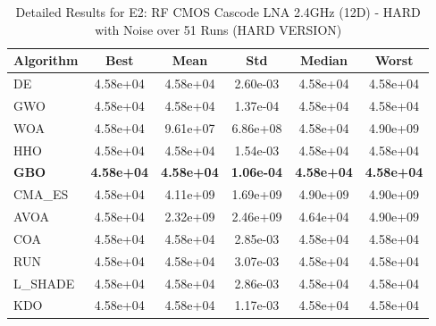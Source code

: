 \begin{table}[htbp]
\centering
\caption{Detailed Results for E2: RF CMOS Cascode LNA 2.4GHz (12D) - HARD with Noise over 51 Runs (HARD VERSION)}
\label{tab:P2_detailed}
\small
\begin{tabular}{lccccc}
\toprule
\textbf{Algorithm} & \textbf{Best} & \textbf{Mean} & \textbf{Std} & \textbf{Median} & \textbf{Worst} \\
\midrule
DE & 4.58e+04 & 4.58e+04 & 2.60e-03 & 4.58e+04 & 4.58e+04 \\
GWO & 4.58e+04 & 4.58e+04 & 1.37e-04 & 4.58e+04 & 4.58e+04 \\
WOA & 4.58e+04 & 9.61e+07 & 6.86e+08 & 4.58e+04 & 4.90e+09 \\
HHO & 4.58e+04 & 4.58e+04 & 1.54e-03 & 4.58e+04 & 4.58e+04 \\
\textbf{GBO} & \textbf{4.58e+04} & \textbf{4.58e+04} & \textbf{1.06e-04} & \textbf{4.58e+04} & \textbf{4.58e+04} \\
CMA_ES & 4.58e+04 & 4.11e+09 & 1.69e+09 & 4.90e+09 & 4.90e+09 \\
AVOA & 4.58e+04 & 2.32e+09 & 2.46e+09 & 4.64e+04 & 4.90e+09 \\
COA & 4.58e+04 & 4.58e+04 & 2.85e-03 & 4.58e+04 & 4.58e+04 \\
RUN & 4.58e+04 & 4.58e+04 & 3.07e-03 & 4.58e+04 & 4.58e+04 \\
L_SHADE & 4.58e+04 & 4.58e+04 & 2.86e-03 & 4.58e+04 & 4.58e+04 \\
KDO & 4.58e+04 & 4.58e+04 & 1.17e-03 & 4.58e+04 & 4.58e+04 \\
\bottomrule
\end{tabular}
\end{table}
